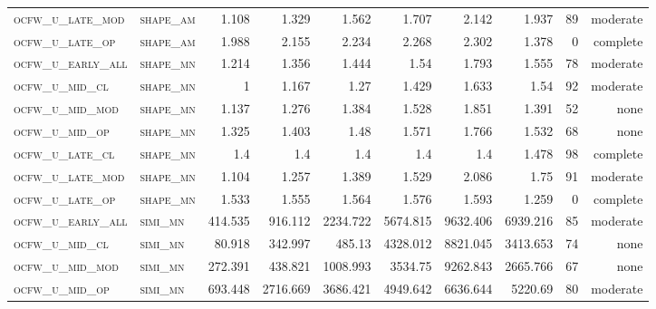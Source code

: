 \begin{landscape}
\begin{center}
\begin{footnotesize}
\begin{longtable}{llrrrrr|rrr}
\textsc{ocfw\_u\_late\_mod } & \textsc{shape\_am }    & 1.108    & 1.329    & 1.562    & 1.707    & 2.142     & 1.937         & 89            & moderate       \\
\textsc{ocfw\_u\_late\_op  } & \textsc{shape\_am }    & 1.988    & 2.155    & 2.234    & 2.268    & 2.302     & 1.378         & 0             & complete           \\
\textsc{ocfw\_u\_early\_all} & \textsc{shape\_mn }    & 1.214    & 1.356    & 1.444    & 1.54     & 1.793     & 1.555         & 78            & moderate       \\
\textsc{ocfw\_u\_mid\_cl   } & \textsc{shape\_mn }    & 1        & 1.167    & 1.27     & 1.429    & 1.633     & 1.54          & 92            & moderate       \\
\textsc{ocfw\_u\_mid\_mod  } & \textsc{shape\_mn }    & 1.137    & 1.276    & 1.384    & 1.528    & 1.851     & 1.391         & 52            & none       \\
\textsc{ocfw\_u\_mid\_op   } & \textsc{shape\_mn }    & 1.325    & 1.403    & 1.48     & 1.571    & 1.766     & 1.532         & 68            & none       \\
\textsc{ocfw\_u\_late\_cl  } & \textsc{shape\_mn }    & 1.4      & 1.4      & 1.4      & 1.4      & 1.4       & 1.478         & 98            & complete       \\
\textsc{ocfw\_u\_late\_mod } & \textsc{shape\_mn }    & 1.104    & 1.257    & 1.389    & 1.529    & 2.086     & 1.75          & 91            & moderate       \\
\textsc{ocfw\_u\_late\_op  } & \textsc{shape\_mn }    & 1.533    & 1.555    & 1.564    & 1.576    & 1.593     & 1.259         & 0             & complete           \\
\textsc{ocfw\_u\_early\_all} & \textsc{simi\_mn  }    & 414.535  & 916.112  & 2234.722 & 5674.815 & 9632.406  & 6939.216      & 85            & moderate       \\
\textsc{ocfw\_u\_mid\_cl   } & \textsc{simi\_mn  }    & 80.918   & 342.997  & 485.13   & 4328.012 & 8821.045  & 3413.653      & 74            & none       \\
\textsc{ocfw\_u\_mid\_mod  } & \textsc{simi\_mn  }    & 272.391  & 438.821  & 1008.993 & 3534.75  & 9262.843  & 2665.766      & 67            & none       \\
\textsc{ocfw\_u\_mid\_op   } & \textsc{simi\_mn  }    & 693.448  & 2716.669 & 3686.421 & 4949.642 & 6636.644  & 5220.69       & 80            & moderate       \\

\end{longtable}
\end{footnotesize}
\end{center}
\end{landscape}
